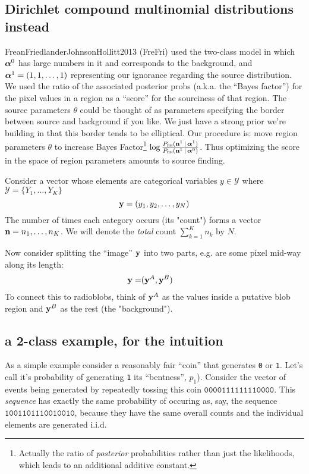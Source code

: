 \documentclass[12pt]{article}
\begin{document}
\subsection{Dirichlet compound multinomial distributions instead} 
FreanFriedlanderJohnsonHollitt2013 ({\sc FreFri}) used the two-class model in
which $\boldsymbol\alpha^0$ has large numbers in it and corresponds to the
background, and $\boldsymbol\alpha^1 = (1,1,\ldots,1)$ representing our
ignorance regarding the source distribution. We used the ratio of the
associated posterior probs (a.k.a. the ``Bayes factor'') for the pixel
values in a region as a ``score'' for the sourciness of that
region. The source parameters $\theta$ could be thought of as
parameters specifying the border between source and background if you
like. We just have a strong prior we're building in that this border
tends to be elliptical.  Our procedure is: move region parameters
$\theta$ to increase Bayes Factor\footnote{Actually the ratio of
  \emph{posterior} probabilities rather than just the likelihoods,
  which leads to an additional additive constant.} $\log
\frac{P_\text{\tiny\sc dm}(\mathbf{n}^1 \,|\, \boldsymbol\alpha^1)}{P_\text{\tiny\sc dm}(\mathbf{n}^1 \,|\,
  \boldsymbol\alpha^0)}$.  Thus optimizing the score in the space of region
parameters amounts to source finding.






Consider a vector whose elements are categorical variables $y \in \mathcal{Y} $ where $\mathcal{Y} = \{Y_1,\ldots,Y_K \}$
\[
\mathbf{y} = (y_1,y_2, \ldots, y_N) \]
The number of times each category occurs (its "count") forms a vector
$ \mathbf{n} = n_1,\ldots,n_K  $. We will denote the {\it total} count $\sum_{k=1}^K n_k$ by $N$.

Now consider splitting the ``image'' $\mathbf{y}$ into two parts, e.g. are some pixel mid-way along its length:
\begin{align*}
\mathbf{y} =& (\mathbf{y}^A, \mathbf{y}^B)
\end{align*}
To connect this to radioblobs, think of $\mathbf{y}^A$ as the values inside a putative blob region and $\mathbf{y}^B$ as the rest (the "background").

\subsection{a 2-class example, for the intuition}

As a simple example consider a reasonably fair ``coin'' that
generates \texttt{0} or \texttt{1}. Let's call it's probability of
generating \texttt{1} its ``bentness'', $p_1$).  Consider the vector
of events being generated by repeatedly tossing this coin
$\mathtt{0000111111110000}$.  This {\it sequence} has exactly the same
probability of occuring as, say, the sequence
$\mathtt{1001101110010010}$, because they have the same overall counts
and the individual elements are generated i.i.d.
\end{document}
